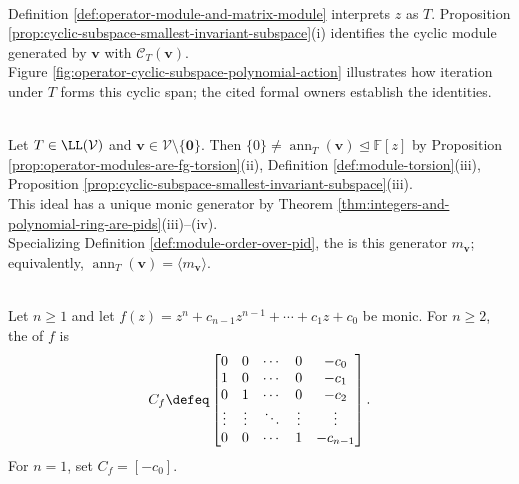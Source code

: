 \begin{perspective} \label{per:operator-as-polynomial-action} \\
Definition \ref{def:operator-module-and-matrix-module} interprets $z$ as $T$. Proposition \ref{prop:cyclic-subspace-smallest-invariant-subspace}(i) identifies the cyclic module generated by $\mathbf{v}$ with $\mathcal{C}_T(\mathbf{v})$.\\
Figure \ref{fig:operator-cyclic-subspace-polynomial-action} illustrates how iteration under $T$ forms this cyclic span; the cited formal owners establish the identities.
\end{perspective}

\begin{illustrationfigure}[H]
  \centering
  
  \caption{Iteration under $T$ forms the orbit whose finite linear span is $\mathcal{C}_T(\mathbf{v})$.}
  \label{fig:operator-cyclic-subspace-polynomial-action}
\end{illustrationfigure}

\begin{definition} \label{def:vector-order-under-operator} \\
Let $T\in\LL(\mathcal{V})$ and $\mathbf{v}\in\mathcal{V}\setminus\{\mathbf{0}\}$. Then $\{0\}\neq\operatorname{ann}_T(\mathbf{v})\trianglelefteq\mathbb{F}[z]$ by Proposition \ref{prop:operator-modules-are-fg-torsion}(ii), Definition \ref{def:module-torsion}(iii), Proposition \ref{prop:cyclic-subspace-smallest-invariant-subspace}(iii).\\
This ideal has a unique monic generator by Theorem \ref{thm:integers-and-polynomial-ring-are-pids}(iii)--(iv).\\
Specializing Definition \ref{def:module-order-over-pid}, the  is this generator $m_{\mathbf{v}}$; equivalently, $\operatorname{ann}_T(\mathbf{v})=\langle m_{\mathbf{v}}\rangle$.
\end{definition}

\begin{definition} \label{def:companion-matrix} \\
Let $n\geq1$ and let $f(z)=z^n+c_{n-1}z^{n-1}+\cdots+c_1z+c_0$ be monic. For $n\geq2$, the  of $f$ is
\begin{align}
C_f\defeq
\begin{bmatrix}
0&0&\cdots&0&-c_0\\
1&0&\cdots&0&-c_1\\
0&1&\cdots&0&-c_2\\
\vdots&\vdots&\ddots&\vdots&\vdots\\
0&0&\cdots&1&-c_{n-1}
\end{bmatrix}.
\nonumber
\end{align}
For $n=1$, set $C_f=[-c_0]$.
\end{definition}

